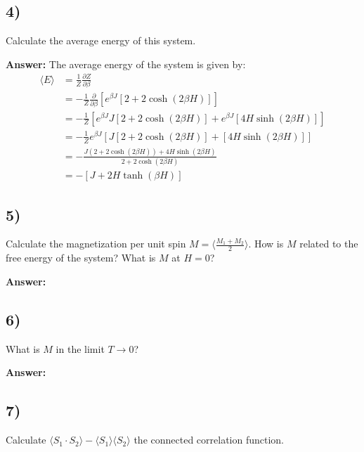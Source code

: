 \documentclass[a4paper]{article}
\newcommand{\newparagraph}{\vspace{.5cm}\noindent}
\newcommand{\average}[1]{\langle #1 \rangle}
\begin{document}
\subsection*{4)}
Calculate the average energy of this system.

\newparagraph
\textbf{Answer:} The average energy of the system is given by:
\begin{align*}
    \average{E} &= \frac{1}{Z}\frac{\partial Z}{\partial \beta}\\
    &= -\frac{1}{Z}\frac{\partial}{\partial \beta}\left[e^{\beta J}\left[2 + 2\cosh(2\beta H)\right]\right]\\
    &= -\frac{1}{Z}\left[e^{\beta J}J\left[2 + 2\cosh(2\beta H)\right] + e^{\beta J}\left[4H\sinh(2\beta H)\right]\right]\\
    &= -\frac{1}{Z}e^{\beta J}\left[J\left[2 + 2\cosh(2\beta H)\right] + \left[4H\sinh(2\beta H)\right]\right]\\
    &= -\frac{J\left(2 + 2\cosh(2\beta H)\right) + 4H\sinh(2\beta H)}{2 + 2\cosh(2\beta H)}\\
    &=  -\left[J+ 2H\tanh(\beta H)\right]
\end{align*}

\subsection*{5)}
Calculate the magnetization per unit spin $M =\langle\frac{M_1 + M_2}{2}\rangle$. How is $M$ related to the free energy of the system?
What is $M$ at $H = 0$?

\newparagraph
\textbf{Answer:}

\subsection*{6)}
What is $M$ in the limit $T\to 0$?

\newparagraph
\textbf{Answer:}

\subsection*{7)}
Calculate $\average{S_1 \cdot S_2} - \average{S_1}\average{S_2}$ the connected correlation function.
\end{document}
